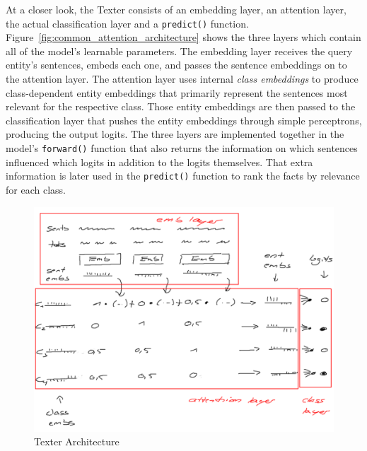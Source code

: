 At a closer look, the Texter consists of an embedding layer, an attention layer, the actual classification layer and a \lstinline{predict()} function. Figure~\ref{fig:common_attention_architecture} shows the three layers which contain all of the model's learnable parameters. The embedding layer receives the query entity's sentences, embeds each one, and passes the sentence embeddings on to the attention layer. The attention layer uses internal \emph{class embeddings} to produce class-dependent entity embeddings that primarily represent the sentences most relevant for the respective class. Those entity embeddings are then passed to the classification layer that pushes the entity embeddings through simple perceptrons, producing the output logits. The three layers are implemented together in the model's \lstinline{forward()} function that also returns the information on which sentences influenced which logits in addition to the logits themselves. That extra information is later used in the \lstinline{predict()} function to rank the facts by relevance for each class.

\begin{figure}[t]
    \centering
    \includegraphics[width=\textwidth]{4_approach/1_texter/2_attention_model/texter_architecture}
    \caption{Texter Architecture}
    \label{fig:4_approach/1_texter/2_attention_model/texter_architecture2}
\end{figure}

